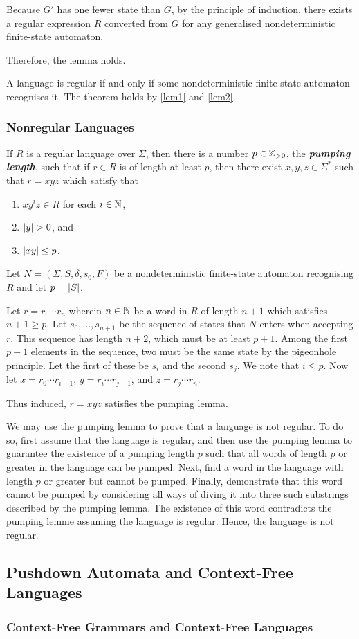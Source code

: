     Because \(G'\) has one fewer state than \(G\), by the principle of
    induction, there exists a regular expression \(R\) converted from \(G\) for
    any generalised nondeterministic finite-state automaton.

    Therefore, the lemma holds.
\Epr

\Bth
    A language is regular if and only if some nondeterministic finite-state
    automaton recognises it.
\Eth
\Bpr
    The theorem holds by \autoref{lem1} and \autoref{lem2}.
\Epr

\subsubsection{Nonregular Languages}

    If \(R\) is a regular language over \(\varSigma\), then there is a number
    \(p \in \mathbb{Z}_{>0}\), the {\it\bf pumping length}, such that if \(r \in R\) is
    of length at least \(p\), then there exist \(x, y, z \in \varSigma^*\) such
    that \(r = x y z\) which satisfy that
    \begin{enumerate}
        \item \(x y^i z \in R\) for each \(i \in \mathbb{N}\),
        \item \(\lvert y\rvert > 0\), and
        \item \(\lvert x y \rvert \leq p\).
    \end{enumerate}
\Eth
\Bpr
    Let \(N = (\varSigma, S, \delta, s_0, F)\) be a nondeterministic
    finite-state automaton recognising \(R\) and let \(p = \lvert S\rvert\).

    Let \(r = r_0 \cdots r_n\) wherein \(n \in \mathbb{N}\) be a word in \(R\) of
    length \(n + 1\) which satisfies \(n + 1 \geq p\). Let \(s_0, \ldots, s_{n +
    1}\) be the sequence of states that \(N\) enters when accepting \(r\). This
    sequence has length \(n + 2\), which must be at least \(p + 1\). Among the
    first \(p + 1\) elements in the sequence, two must be the same state by the
    pigeonhole principle. Let the first of these be \(s_i\) and the second
    \(s_j\). We note that \(i \leq p\). Now let \(x = r_0 \cdots r_{i - 1}\),
    \(y = r_i \cdots r_{j - 1}\), and \(z = r_j \cdots r_n\).

    Thus induced, \(r = x y z\) satisfies the pumping lemma.
\Epr

We may use the pumping lemma to prove that a language is not regular. To do so,
first assume that the language is regular, and then use the pumping lemma to
guarantee the existence of a pumping length \(p\) such that all words of length
\(p\) or greater in the language can be pumped. Next, find a word in the
language with length \(p\) or greater but cannot be pumped. Finally, demonstrate
that this word cannot be pumped by considering all ways of diving it into three
such substrings described by the pumping lemma. The existence of this word
contradicts the pumping lemme assuming the language is regular. Hence, the
language is not regular.

\subsection{Pushdown Automata and Context-Free Languages}

\subsubsection{Context-Free Grammars and Context-Free Languages}

\Edc
